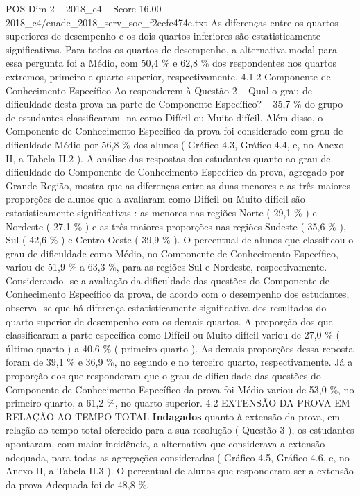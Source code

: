 \begin{textsample}{POS Dim 2 – 2018\_c4 – Score 16.00 – 2018\_c4/enade\_2018\_serv\_soc\_f2ecfc474e.txt}
As diferenças entre os quartos superiores de desempenho e os dois quartos inferiores são estatisticamente significativas.
Para todos os quartos de desempenho, a alternativa modal para essa pergunta foi a Médio, com 50,4 \% e 62,8 \% dos respondentes nos quartos extremos, primeiro e quarto superior, respectivamente. 4.1.2 Componente de Conhecimento Específico Ao responderem à Questão 2 – Qual o grau de dificuldade desta prova na parte de Componente Específico? – 35,7 \% do grupo de estudantes classificaram -na como Difícil ou Muito difícil.
Além disso, o Componente de Conhecimento Específico da prova foi considerado com grau de dificuldade Médio por 56,8 \% dos alunos ( Gráfico 4.3, Gráfico 4.4, e, no Anexo II, a Tabela II.2 ).
A análise das respostas dos estudantes quanto ao grau de dificuldade do Componente de Conhecimento Específico da prova, agregado por Grande Região, mostra que as diferenças entre as duas menores e as três maiores proporções de alunos que a avaliaram como Difícil ou Muito difícil são estatisticamente significativas : as menores nas regiões Norte ( 29,1 \% ) e Nordeste ( 27,1 \% ) e as três maiores proporções nas regiões Sudeste ( 35,6 \% ), Sul ( 42,6 \% ) e Centro-Oeste ( 39,9 \% ).
O percentual de alunos que classificou o grau de dificuldade como Médio, no Componente de Conhecimento Específico, variou de 51,9 \% a 63,3 \%, para as regiões Sul e Nordeste, respectivamente.
Considerando -se a avaliação da dificuldade das questões do Componente de Conhecimento Específico da prova, de acordo com o desempenho dos estudantes, observa -se que há diferença estatisticamente significativa dos resultados do quarto superior de desempenho com os demais quartos.
A proporção dos que classificaram a parte específica como Difícil ou Muito difícil variou de 27,0 \% ( último quarto ) a 40,6 \% ( primeiro quarto ).
As demais proporções dessa reposta foram de 39,1 \% e 36,9 \%, no segundo e no terceiro quarto, respectivamente.
Já a proporção dos que responderam que o grau de dificuldade das questões do Componente de Conhecimento Específico da prova foi Médio variou de 53,0 \%, no primeiro quarto, a 61,2 \%, no quarto superior. 4.2 EXTENSÃO DA PROVA EM RELAÇÃO AO TEMPO TOTAL \textbf{Indagados} quanto à extensão da prova, em relação ao tempo total oferecido para a sua resolução ( Questão 3 ), os estudantes apontaram, com maior incidência, a alternativa que considerava a extensão adequada, para todas as agregações consideradas ( Gráfico 4.5, Gráfico 4.6, e, no Anexo II, a Tabela II.3 ).
O percentual de alunos que responderam ser a extensão da prova Adequada foi de 48,8 \%.

\end{textsample}
